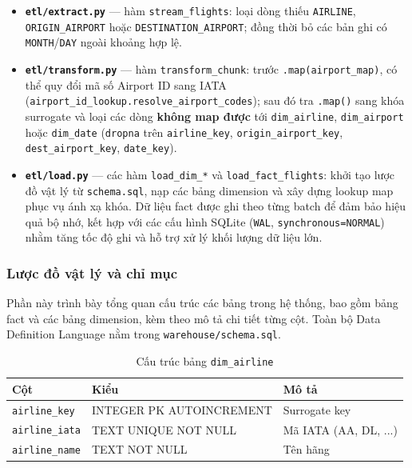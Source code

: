 \begin{itemize}
    \item \textbf{\texttt{etl/extract.py}} --- hàm \texttt{stream\_flights}:
          loại dòng thiếu \texttt{AIRLINE}, \texttt{ORIGIN\_AIRPORT} hoặc
          \texttt{DESTINATION\_AIRPORT}; đồng thời bỏ các bản ghi có
          \texttt{MONTH}/\texttt{DAY} ngoài khoảng hợp lệ.
    \item \textbf{\texttt{etl/transform.py}} --- hàm \texttt{transform\_chunk}:
          trước \texttt{.map(airport\_map)}, có thể quy đổi mã số Airport ID sang IATA
          (\texttt{airport\_id\_lookup.resolve\_airport\_codes}); sau đó tra \texttt{.map()}
          sang khóa surrogate và loại các dòng \textbf{không map được} tới
          \texttt{dim\_airline}, \texttt{dim\_airport} hoặc \texttt{dim\_date}
          (\texttt{dropna} trên \texttt{airline\_key}, \texttt{origin\_airport\_key},
          \texttt{dest\_airport\_key}, \texttt{date\_key}).
    \item \textbf{\texttt{etl/load.py}} --- các hàm \texttt{load\_dim\_*} và \texttt{load\_fact\_flights}:
          khởi tạo lược đồ vật lý từ \texttt{schema.sql}, nạp các bảng dimension và xây dựng lookup map phục vụ ánh xạ khóa.
          Dữ liệu fact được ghi theo từng batch để đảm bảo hiệu quả bộ nhớ, kết hợp với các cấu hình SQLite (\texttt{WAL}, \texttt{synchronous=NORMAL}) nhằm tăng tốc độ ghi và hỗ trợ xử lý khối lượng dữ liệu lớn.
\end{itemize}


\subsubsection{Lược đồ vật lý và chỉ mục}

Phần này trình bày tổng quan cấu trúc các bảng trong hệ thống, bao gồm bảng fact và các bảng dimension, kèm theo mô tả chi tiết từng cột.
Toàn bộ Data Definition Language nằm trong \texttt{warehouse/schema.sql}.
\begin{table}[H]
\centering
\caption{Cấu trúc bảng \texttt{dim\_airline}}
\vspace{4pt}
\begin{tabular}{|l|l|l|}
\hline
\textbf{Cột} & \textbf{Kiểu} & \textbf{Mô tả} \\ \hline
\texttt{airline\_key}  & INTEGER PK AUTOINCREMENT & Surrogate key \\ \hline
\texttt{airline\_iata} & TEXT UNIQUE NOT NULL & Mã IATA (AA, DL, ...) \\ \hline
\texttt{airline\_name} & TEXT NOT NULL & Tên hãng \\ \hline
\end{tabular}
\end{table}

